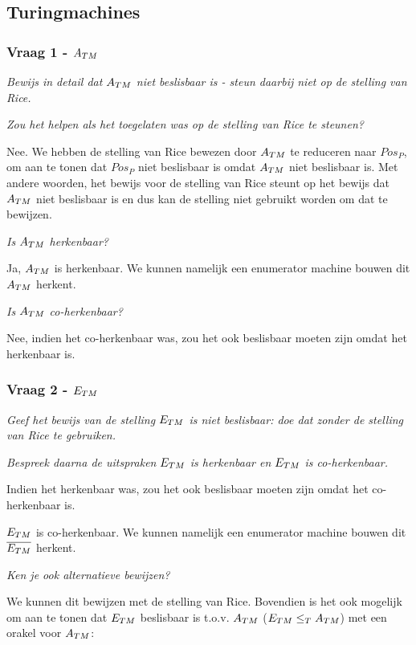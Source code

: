 \subsection{Turingmachines}

\subsubsection{Vraag 1 - ${A_{TM}}$}

\textit{Bewijs in detail dat ${A_{TM}}$ niet beslisbaar is - steun daarbij niet op de stelling van Rice.}



\textit{Zou het helpen als het toegelaten was op de stelling van Rice te steunen?}

Nee. We hebben de stelling van Rice bewezen door ${A_{TM}}$ te reduceren naar $Pos_P$, om aan te tonen dat $Pos_P$ niet beslisbaar is omdat ${A_{TM}}$ niet beslisbaar is. Met andere woorden, het bewijs voor de stelling van Rice steunt op het bewijs dat ${A_{TM}}$ niet beslisbaar is en dus kan de stelling niet gebruikt worden om dat te bewijzen.

\textit{Is ${A_{TM}}$ herkenbaar?}

Ja, ${A_{TM}}$ is herkenbaar. We kunnen namelijk een enumerator machine bouwen dit ${A_{TM}}$ herkent.

\textit{Is ${A_{TM}}$ co-herkenbaar?}

Nee, indien het co-herkenbaar was, zou het ook beslisbaar moeten zijn omdat het herkenbaar is.

\subsubsection{Vraag 2 - ${E_{TM}}$}

\textit{Geef het bewijs van de stelling ${E_{TM}}$ is niet beslisbaar: doe dat zonder de stelling van Rice te gebruiken.}



\textit{Bespreek daarna de uitspraken ${E_{TM}}$ is herkenbaar en ${E_{TM}}$ is co-herkenbaar.}

Indien het herkenbaar was, zou het ook beslisbaar moeten zijn omdat het co-herkenbaar is.

${E_{TM}}$ is co-herkenbaar. We kunnen namelijk een enumerator machine bouwen dit $\overline{{E_{TM}}}$ herkent.

\textit{Ken je ook alternatieve bewijzen?}

We kunnen dit bewijzen met de stelling van Rice. Bovendien is het ook mogelijk om aan te tonen dat ${E_{TM}}$ beslisbaar is t.o.v. ${A_{TM}}$ (${E_{TM}} \leq_T {A_{TM}}$) met een orakel voor ${A_{TM}}$:

